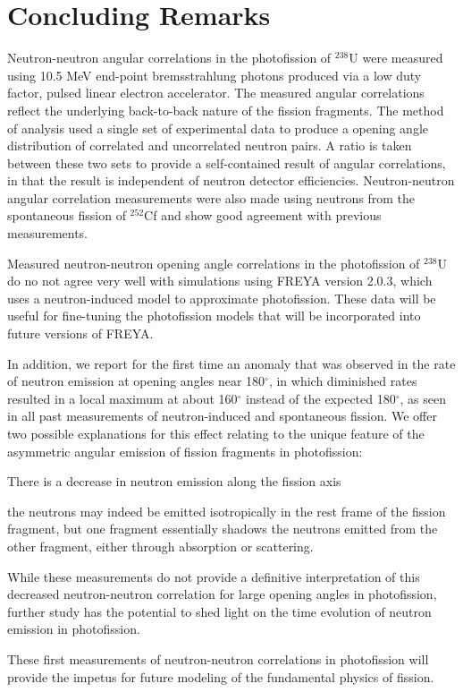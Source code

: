 \chapter{Concluding Remarks}
\thispagestyle{fancy}
Neutron-neutron angular correlations in the photofission of $^{238}$U were measured using 10.5 MeV end-point bremsstrahlung photons produced via a low duty factor, pulsed linear electron accelerator.
The measured angular correlations reflect the underlying back-to-back nature of the fission fragments.
The method of analysis used a single set of experimental data to produce a opening angle distribution of correlated and uncorrelated neutron pairs.
A ratio is taken between these two sets to provide a self-contained result of angular correlations, in that the result is independent of neutron detector efficiencies.
Neutron-neutron angular correlation measurements were also made using neutrons from the spontaneous fission of $^{252}$Cf and show good agreement with previous measurements.

Measured neutron-neutron opening angle correlations in the photofission of $^{238}$U do no not agree very well with simulations using FREYA version 2.0.3, which uses a neutron-induced model to approximate photofission.
These data will be useful for fine-tuning the photofission models that will be incorporated into future versions of FREYA.

In addition, we report for the first time an anomaly that was observed in the rate of neutron emission at opening angles near 180$^{\circ}$, in which diminished rates resulted in a local maximum at about 160$^{\circ}$ instead of the expected 180$^{\circ}$, as seen in all past measurements of neutron-induced and spontaneous fission.
We offer two possible explanations for this effect relating to the unique feature of the asymmetric angular emission of fission fragments in photofission:
\begin{enumerate*}[label=(\roman*), itemjoin={{, }}, itemjoin*={{, or }}]
  \item There is a decrease in neutron emission along the fission axis
  \item the neutrons may indeed be emitted isotropically in the rest frame of the fission fragment, but one fragment essentially shadows the neutrons emitted from the other fragment, either through absorption or scattering.
  \end{enumerate*}
While these measurements do not provide a definitive interpretation of this decreased neutron-neutron correlation for large opening angles in photofission, further study has the potential to shed light on the time evolution of neutron emission in photofission.

These first measurements of neutron-neutron correlations in photofission will provide the impetus for future modeling of the fundamental physics of fission.
